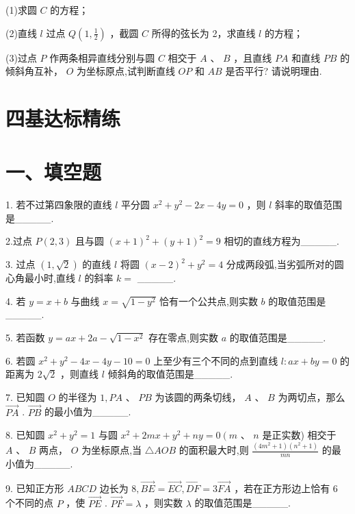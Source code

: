 (1)求圆 $C$ 的方程；

(2)直线 $l$ 过点 $Q\left( {1,\frac{1}{2}}\right)$ ，截圆 $C$ 所得的弦长为 2，求直线 $l$ 的方程；

(3)过点 $P$ 作两条相异直线分别与圆 $C$ 相交于 $A$ 、 $B$ ，且直线 ${PA}$ 和直线 ${PB}$ 的倾斜角互补， $O$ 为坐标原点,试判断直线 ${OP}$ 和 ${AB}$ 是否平行? 请说明理由.

\section*{四基达标精练}

\section*{一、填空题}

1. 若不过第四象限的直线 $l$ 平分圆 ${x}^{2} + {y}^{2} - {2x} - {4y} = 0$ ，则 $l$ 斜率的取值范围是\_\_\_\_\_.

2.过点 $P\left( {2,3}\right)$ 且与圆 ${\left( x + 1\right) }^{2} + {\left( y + 1\right) }^{2} = 9$ 相切的直线方程为\_\_\_\_\_.

3. 过点 $\left( {1,\sqrt{2}}\right)$ 的直线 $l$ 将圆 ${\left( x - 2\right) }^{2} + {y}^{2} = 4$ 分成两段弧,当劣弧所对的圆心角最小时,直线 $l$ 的斜率 $k =$ \_\_\_\_\_.

4. 若 $y = x + b$ 与曲线 $x = \sqrt{1 - {y}^{2}}$ 恰有一个公共点,则实数 $b$ 的取值范围是\_\_\_\_\_.

5. 若函数 $y = {ax} + {2a} - \sqrt{1 - {x}^{2}}$ 存在零点,则实数 $a$ 的取值范围是\_\_\_\_\_.

6. 若圆 ${x}^{2} + {y}^{2} - {4x} - {4y} - {10} = 0$ 上至少有三个不同的点到直线 $l : {ax} + {by} = 0$ 的距离为 $2\sqrt{2}$ ，则直线 $l$ 倾斜角的取值范围是\_\_\_\_\_.

7. 已知圆 $O$ 的半径为 $1,{PA}\text{ 、 }{PB}$ 为该圆的两条切线， $A$ 、 $B$ 为两切点，那么 $\overrightarrow{PA}$ . $\overrightarrow{PB}$ 的最小值为\_\_\_\_\_.

8. 已知圆 ${x}^{2} + {y}^{2} = 1$ 与圆 ${x}^{2} + {2mx} + {y}^{2} + {ny} = 0\left( {m\text{ 、 }n}\right.$ 是正实数) 相交于 $A\text{ 、 }B$ 两点， $O$ 为坐标原点,当 $\bigtriangleup {AOB}$ 的面积最大时,则 $\frac{\left( {4{m}^{2} + 1}\right) \left( {{n}^{2} + 1}\right) }{mn}$ 的最小值为\_\_\_\_\_.

9. 已知正方形 ${ABCD}$ 边长为 $8,\overrightarrow{BE} = \overrightarrow{EC},\overrightarrow{DF} = 3\overrightarrow{FA}$ ，若在正方形边上恰有 6 个不同的点 $P$ ，使 $\overrightarrow{PE}$ . $\overrightarrow{PF} = \lambda$ ，则实数 $\lambda$ 的取值范围是\_\_\_\_\_.


